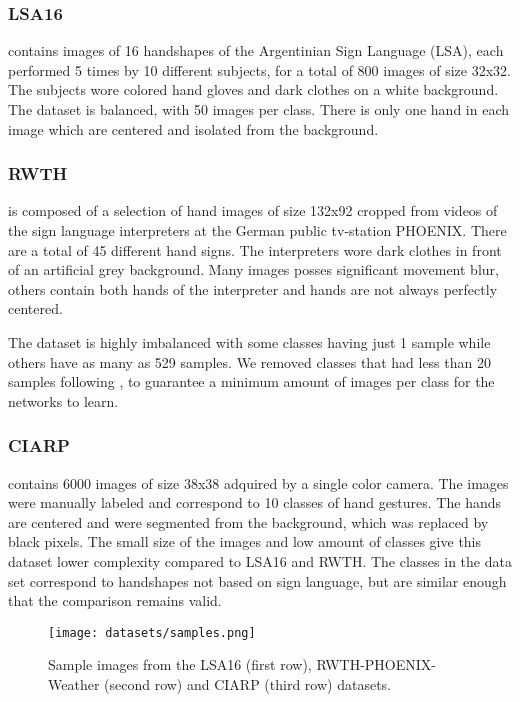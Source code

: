 \subsubsection{LSA16} \cite{Ronchetti2016} contains images of 16 handshapes of the Argentinian Sign Language (LSA), each performed 5 times by 10 different subjects, for a total of 800 images of size 32x32. The subjects wore colored hand gloves and dark clothes on a white background. The dataset is balanced, with 50 images per class. There is only one hand in each image which are centered and isolated from the background.

\subsubsection{RWTH} \cite{koller16:deephand} is composed of a selection of  hand images of size 132x92 cropped from  videos of the sign language interpreters at the German public tv-station PHOENIX. There are a total of 45 different hand signs. The interpreters wore dark clothes in front of an artificial grey background. Many images posses significant movement blur,  others contain both hands of the interpreter and hands are not always perfectly centered.

The dataset is highly imbalanced with some classes having just 1 sample while others have as many as 529 samples. We removed classes that had less than 20 samples following \cite{quiroga2017study}, to guarantee a minimum amount of images per class for the networks to learn.

\subsubsection{CIARP} \cite{ciarp2018} contains 6000 images of size 38x38 adquired by a single color camera. The images were manually labeled and correspond to 10 classes of hand gestures. The hands are centered and were segmented from the background, which was replaced by black pixels. The small size of the images and low amount of classes give this dataset lower complexity compared to LSA16 and RWTH.  The  classes in the data set correspond to handshapes  not based on sign language, but are similar enough  that the comparison remains valid.

\begin{figure}
    \centering
    \texttt{[image: datasets/samples.png]}
    \caption{Sample images from the LSA16 (first row), RWTH-PHOENIX-Weather (second row) and CIARP (third row) datasets.}
    \label{fig:datasets}
\end{figure}